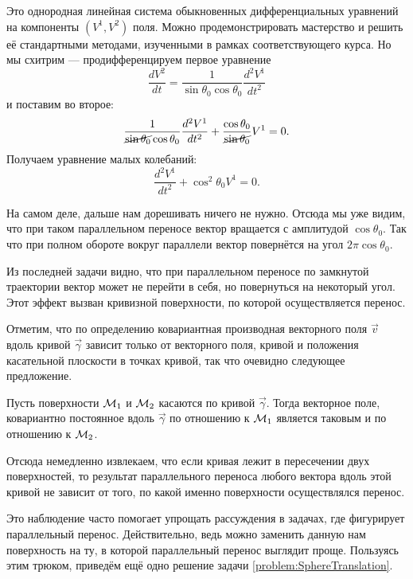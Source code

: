 \begin{firstsolution}
	Это однородная линейная система обыкновенных дифференциальных уравнений на компоненты $(V^1, V^2)$ поля. Можно продемонстрировать мастерство и решить её стандартными методами, изученными в рамках соответствующего курса. Но мы схитрим --- продифференцируем первое уравнение
	\[
		\frac{dV^2}{dt} = \frac{1}{\sin\theta_0\cos\theta_0}\frac{d^2V^1}{dt^2}
	\]
	и поставим во второе:
	\[
		\frac{1}{\cancel{\sin\theta_0}\cos\theta_0}\frac{d^2V^1}{dt^2} + \frac{\cos\theta_0}{\cancel{\sin\theta_0}}V^1 = 0.
	\]
	Получаем уравнение малых колебаний:
	\[
		\frac{d^2V^1}{dt^2} + \cos^2\theta_0V^1 = 0.
	\]

	На самом деле, дальше нам дорешивать ничего не нужно. Отсюда мы уже видим, что при таком параллельном переносе вектор вращается с амплитудой $\cos\theta_0$. Так что при полном обороте вокруг параллели вектор повернётся на угол $2\pi\cos\theta_0$.
\end{firstsolution}

Из последней задачи видно, что при параллельном переносе по замкнутой траектории вектор может не перейти в себя, но повернуться на некоторый угол. Этот эффект вызван кривизной поверхности, по которой осуществляется перенос.

Отметим, что по определению ковариантная производная векторного поля $\vec{v}$ вдоль кривой $\vec{\gamma}$ зависит только от векторного поля, кривой и положения касательной плоскости в точках кривой, так что очевидно следующее предложение.

\begin{proposition}
	Пусть поверхности $\mathcal{M}_1$ и $\mathcal{M}_2$ касаются по кривой $\vec{\gamma}$. Тогда векторное поле, ковариантно постоянное вдоль $\vec{\gamma}$ по отношению к $\mathcal{M}_1$ является таковым и по отношению к $\mathcal{M}_2$.
\end{proposition}

Отсюда немедленно извлекаем, что если кривая лежит в пересечении двух поверхностей, то результат параллельного переноса любого вектора вдоль этой кривой не зависит от того, по какой именно поверхности осуществлялся перенос.

Это наблюдение часто помогает упрощать рассуждения в задачах, где фигурирует параллельный перенос. Действительно, ведь можно заменить данную нам поверхность на ту, в которой параллельный перенос выглядит проще. Пользуясь этим трюком, приведём ещё одно решение задачи \ref{problem:SphereTranslation}.

